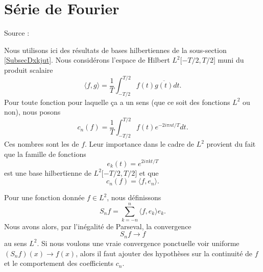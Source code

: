 
\section{Série de Fourier}

Source : \cite{MaureyHilbertFourier}

Nous utilisons ici des résultats de bases hilbertiennes de la sous-section \ref{SubsecDxkjut}. Nous considérons l'espace de Hilbert \( L^2\mathopen[ -T/2 , T/2 \mathclose]\) muni du produit scalaire
\begin{equation}
    \langle f, g\rangle =\frac{1}{ T }\int_{-T/2}^{T/2}f(t)\overline{ g(t) }dt.
\end{equation}
Pour toute fonction pour laquelle ça a un sens (que ce soit des fonctions \( L^2\) ou non), nous posons
\begin{equation}\label{EqhIPoPH}
    c_n(f)=\frac{1}{ T }\int_{-T/2}^{T/2}f(t) e^{-2i\pi nt/T}dt.
\end{equation}
Ces nombres sont les  de \( f\). Leur importance dans le cadre de \( L^2\) provient du fait que la famille de fonctions
\begin{equation}
    e_k(t)=  e^{2i\pi kt/T}
\end{equation}
est une base hilbertienne de \( L^2\mathopen[ -T/2 , T/2 \mathclose]\) et que
\begin{equation}
    c_n(f)=\langle f, e_n\rangle .
\end{equation}


Pour une fonction donnée \( f\in L^2\), nous définissons 
\begin{equation}
    S_nf=\sum_{k=-n}^n\langle f, e_k\rangle e_k.
\end{equation}
Nous avons alors, par l'inégalité de Parseval, la convergence
\begin{equation}
    S_nf\to f
\end{equation}
au sens \( L^2\). Si nous voulons une vraie convergence ponctuelle voir uniforme \( (S_nf)(x)\to f(x)\), alors il faut ajouter des hypothèses sur la continuité de \( f\) et le comportement des coefficients \( c_n\).

